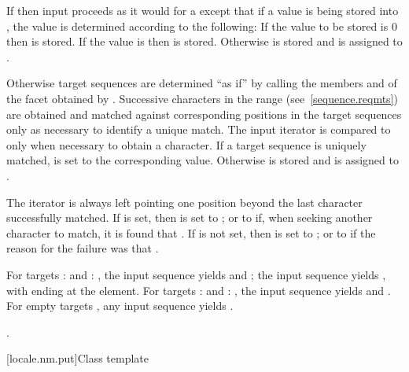 \begin{itemdescr}
\pnum
\effects
If
then input proceeds as it would for a
except that if a value is being stored into ,
the value is determined according to the following:
If the value to be stored is 0 then
is stored.
If the value is 
then
is stored.
Otherwise  is stored and  is assigned to .

\pnum
Otherwise target sequences are determined ``as if'' by calling the
members
and
of the facet obtained by
.
Successive characters in the range
(see~\ref{sequence.reqmts}) are obtained and
matched against corresponding positions in the target sequences only
as necessary to identify a unique match. The input iterator  is
compared to  only when necessary to obtain a character. If a target sequence is uniquely matched,  is set to the
corresponding value. Otherwise  is stored and  is assigned to .

\pnum
The  iterator is always left pointing one position beyond the last
character successfully matched. If  is set, then  is set to
;
or to
if, when seeking another character to match, it is found that
.
If  is not set, then  is set to
;
or to
if the reason for the failure was that
.
\begin{example}
For targets
:
and
:
,
the input sequence
yields
and
;
the input sequence
yields
,
with  ending at the
element. For targets
:
and
:
, the input sequence  yields
and
.
For empty targets , any input sequence yields
.
\end{example}

\pnum
\returns
{}.
\end{itemdescr}

[locale.nm.put]{Class template }

